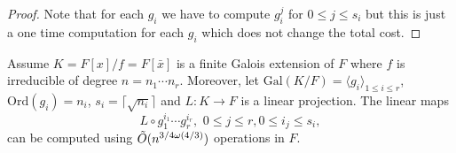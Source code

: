 \begin{proof}
Note that for each $g_i$ we have to compute $g_i^j$ for $0 \leq j \leq s_i$ but this is just a one time computation for each $g_i$
which does not change the total cost.
\end{proof}

\begin{lemma}\label{lem:transmodcomp}
Assume $K = F[x]/f = F[\bar{x}]$ is a finite Galois extension of $F$ where $f$ is irreducible of degree $n = n_1\cdots n_r$. Moreover,
let $\mathrm{Gal}(K/F) = \langle g_i \rangle_{1\leq i \leq r} $, $\mathrm{Ord}(g_i) = n_i$, $s_i = \lceil \sqrt{n_i} \rceil$
 and $L: K\rightarrow F$ is a linear projection. The linear maps
$$L \circ g_1^{i_1} \cdots g_r^{i_r}, \,\, 0\leq j \leq r, 0 \leq i_j \leq s_i, $$ can be computed using $\tilde{O}(n^{3/4 \omega(4/3)})$ operations in $F$. 
\end{lemma} 

